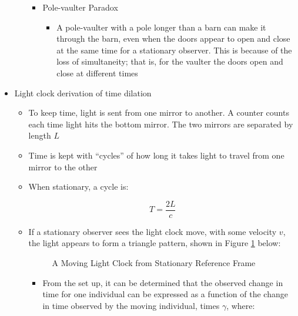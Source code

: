 \begin{itemize}
\begin{itemize}
\begin{itemize}
          \item Pole-vaulter Paradox

            \begin{itemize}

              \item A pole-vaulter with a pole longer than a barn can make it through the barn, even when the doors appear to open and close at the same time for a stationary observer. This is because of the loss of simultaneity; that is, for the vaulter the doors open and close at different times

            \end{itemize}

        \end{itemize}

    \end{itemize}

  \item Light clock derivation of time dilation

    \begin{itemize}

      \item To keep time, light is sent from one mirror to another. A counter counts each time light hits the bottom mirror. The two mirrors are separated by length $L$

      \item Time is kept with ``cycles'' of how long it takes light to travel from one mirror to the other

      \item When stationary, a cycle is:

        $$T=\frac{2L}{c}$$

      \item If a stationary observer sees the light clock move, with some velocity $v$, the light appears to form a triangle pattern, shown in Figure \ref{fig:1} below:

        \begin{figure}[h]
          \centering
          
          \caption{A Moving Light Clock from Stationary Reference Frame}
          \label{fig:1}
        \end{figure}

        \begin{itemize}

          \item From the set up, it can be determined that the observed change in time for one individual can be expressed as a function of the change in time observed by the moving individual, times $\gamma$, where:


\end{itemize}
\end{itemize}
\end{itemize}
